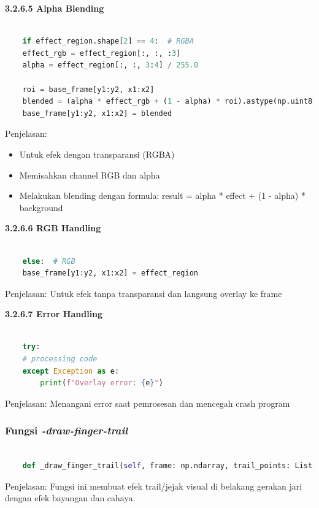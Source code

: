 \documentclass[11pt,a4paper]{article}
\begin{document}
    \noindent\textbf{3.2.6.5 Alpha Blending}
    \begin{lstlisting}[language=Python, caption=Ekstraksi Koordinat]
        
    if effect_region.shape[2] == 4:  # RGBA
    effect_rgb = effect_region[:, :, :3]
    alpha = effect_region[:, :, 3:4] / 255.0
    
    roi = base_frame[y1:y2, x1:x2]
    blended = (alpha * effect_rgb + (1 - alpha) * roi).astype(np.uint8)
    base_frame[y1:y2, x1:x2] = blended
    \end{lstlisting}
    Penjelasan:
    \begin{itemize}
        \item Untuk efek dengan transparansi (RGBA)
        \item Memisahkan channel RGB dan alpha
        \item Melakukan blending dengan formula: result = alpha * effect + (1 - alpha) * background
    \end{itemize}

    \noindent\textbf{3.2.6.6 RGB Handling}
    \begin{lstlisting}[language=Python, caption=RGB Handling]
        
    else:  # RGB
    base_frame[y1:y2, x1:x2] = effect_region
    \end{lstlisting}
    Penjelasan: Untuk efek tanpa transparansi dan langsung overlay ke frame

    \noindent\textbf{3.2.6.7 Error Handling}
    \begin{lstlisting}[language=Python, caption=Ekstraksi Koordinat]
        
    try:
    # processing code
    except Exception as e:
        print(f"Overlay error: {e}")
    \end{lstlisting}
    Penjelasan: Menangani error saat pemrosesan dan mencegah crash program

    \subsubsection{Fungsi \textit{-draw-finger-trail}}
    \begin{lstlisting}[language=Python, caption=Fungsi \textit{-draw-finger-trail}]
    
    def _draw_finger_trail(self, frame: np.ndarray, trail_points: List[Tuple[int, int]]) -> None:
    \end{lstlisting}
    Penjelasan:
    Fungsi ini membuat efek trail/jejak visual di belakang gerakan jari dengan efek bayangan dan cahaya.
\end{document}
